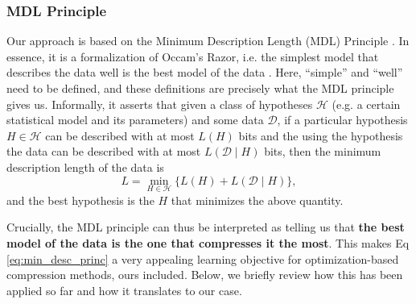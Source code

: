 \documentclass{article}
\newcommand{\Hypos}{\mathcal{H}}
\newcommand{\Data}{\mathcal{D}}
\begin{document}
\subsubsection{MDL Principle} 
\label{sec:mdl}
Our approach is based on the Minimum Description Length (MDL) Principle
\cite{rissanen1986stochastic}. In essence, it is a formalization of Occam's
Razor, i.e. the simplest model that describes the data well is the best model of
the data \cite{grünwald2007minimum}. Here, ``simple'' and ``well'' need to be
defined, and these definitions are precisely what the MDL principle gives us.
Informally, it asserts that given a class of hypotheses $\Hypos$ (e.g. a certain
statistical model and its parameters) and some data $\Data$, if a particular
hypothesis $H \in \Hypos$ can be described with at most $L(H)$ bits and the using the
hypothesis the data can be described with at most $L(\Data \mid H)$ bits, then the
minimum description length of the data is
\begin{equation}
\label{eq:min_desc_princ}
  L = \min_{H \in \Hypos}\{ L(H) + L(\Data \mid H) \},
\end{equation}
and the best hypothesis is the $H$ that minimizes the above quantity.
\par
Crucially, the MDL principle can thus be interpreted as telling us that
\textbf{the best model of the data is the one that compresses it the most}.
This makes Eq \ref{eq:min_desc_princ} a very appealing learning objective for
optimization-based compression methods, ours included.
Below, we briefly review how this has been applied so far and how it translates
to our case.
\end{document}
